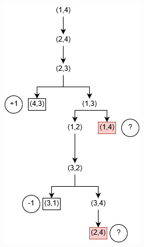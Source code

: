 \documentclass{article}
\begin{document}
\begin{figure}[H]
\centering
\begin{minipage}{.45\linewidth}
  \includegraphics[width=\linewidth]{images/q10_1.jpg}
  \caption{}
  \label{fig:ex1}
\end{minipage}
\hspace{.05\linewidth}
\begin{minipage}{.45\linewidth}

\end{minipage}
\end{figure}
\end{document}

